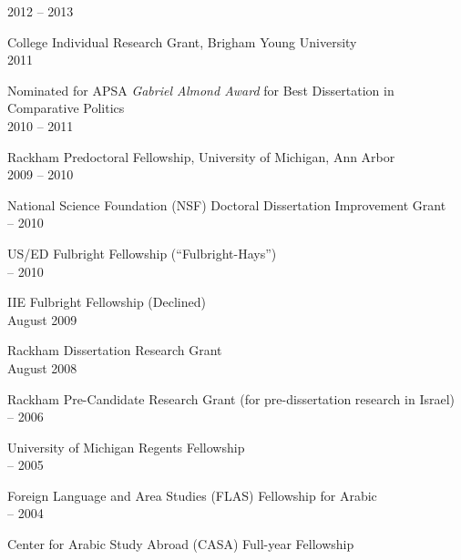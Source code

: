 \documentclass[10pt]{article}
\begin{document}
\raggedleft
\normalsize{2012 -- 2013}\par
\raggedright 
College Individual Research Grant, Brigham Young University\normalsize\\[3pt]

\raggedleft
\normalsize{2011}\par
\raggedright 
Nominated for APSA \textit{Gabriel Almond Award} for Best Dissertation in Comparative Politics\normalsize\\[3pt]

\raggedleft
\normalsize{2010 -- 2011}\par
\raggedright 
Rackham Predoctoral Fellowship, University of Michigan, Ann Arbor\normalsize\\[3pt]

\raggedleft
\normalsize{2009 -- 2010}\par
\raggedright 
National Science Foundation (NSF) Doctoral Dissertation Improvement Grant\normalsize\\[3pt]

 -- 2010\par
\raggedright 
US/ED Fulbright Fellowship (``Fulbright-Hays'')\normalsize\\[3pt]

 -- 2010\par
\raggedright 
IIE Fulbright Fellowship (Declined)\normalsize\\[3pt]

\raggedleft
August 2009\par
\raggedright 
Rackham Dissertation Research Grant\normalsize\\[3pt]

\raggedleft
August 2008\par
\raggedright 
Rackham Pre-Candidate Research Grant (for pre-dissertation research in Israel)\normalsize\\[3pt]

 -- 2006\par
\raggedright 
University of Michigan Regents Fellowship\normalsize\\[3pt]

 -- 2005\par
\raggedright 
Foreign Language and Area Studies (FLAS) Fellowship for Arabic\normalsize\\[3pt]

 -- 2004\par
\raggedright 
Center for Arabic Study Abroad (CASA) Full-year Fellowship\normalsize\\[3pt]
\end{document}
